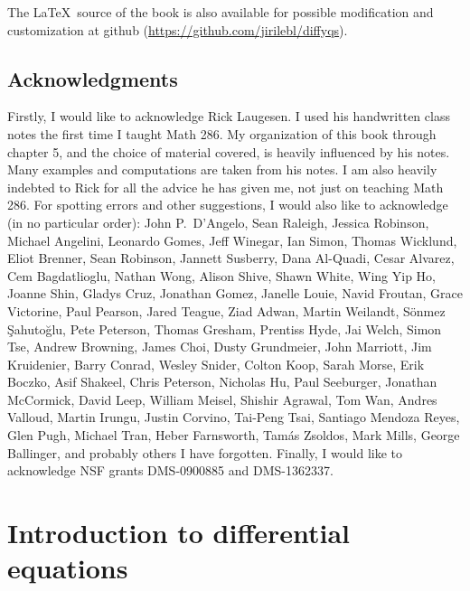 The \LaTeX\ source of the book is also available
for possible modification and customization
at github (\url{https://github.com/jirilebl/diffyqs}).



\subsection{Acknowledgments}

Firstly, I would like to acknowledge Rick Laugesen.  I used his handwritten
class notes
the first time I taught
Math 286.  My organization of this book through chapter 5,
and the choice of
material covered, is heavily influenced by his notes.  Many
examples and computations are taken from his notes.  I am also heavily
indebted to Rick for all the advice he has given me, not just on teaching
Math 286.
For spotting errors and other suggestions,
I would also like to acknowledge (in no particular order):
John P.\ D'Angelo,
Sean Raleigh, Jessica Robinson, Michael Angelini, Leonardo Gomes, Jeff
Winegar, Ian Simon, Thomas Wicklund, Eliot Brenner, Sean Robinson,
Jannett Susberry, Dana Al-Quadi, Cesar Alvarez, Cem Bagdatlioglu,
Nathan Wong, Alison Shive, Shawn White, Wing Yip Ho, Joanne Shin,
Gladys Cruz, Jonathan Gomez, Janelle Louie, Navid Froutan,
Grace Victorine, Paul Pearson, Jared Teague, Ziad Adwan,
Martin Weilandt, S\"{o}nmez \c{S}ahuto\u{g}lu,
Pete Peterson, Thomas Gresham, Prentiss Hyde, Jai Welch,
Simon Tse, Andrew Browning, James Choi, Dusty Grundmeier,
John Marriott,
Jim Kruidenier,
Barry Conrad,
Wesley Snider,
Colton Koop,
Sarah Morse,
Erik Boczko,
Asif Shakeel,
Chris Peterson,
Nicholas Hu,
Paul Seeburger,
Jonathan McCormick,
David Leep,
William Meisel,
Shishir Agrawal,
Tom Wan,
Andres Valloud,
Martin Irungu,
Justin Corvino,
Tai-Peng Tsai,
Santiago Mendoza Reyes,
Glen Pugh,
Michael Tran,
Heber Farnsworth,
Tam\'as Zsoldos,
Mark Mills,
George Ballinger,
and probably others I
have forgotten.
Finally, I would like
to acknowledge NSF grants DMS-0900885 and DMS-1362337.



\sectionnewpage
\section{Introduction to differential equations}
\label{introde:section}


